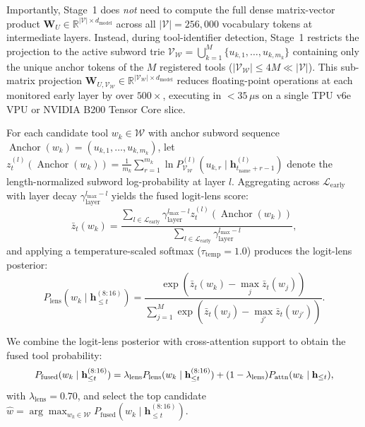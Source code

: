 \documentclass[10pt,conference]{IEEEtran}
\begin{document}
Importantly, Stage~1 does \emph{not} need to compute the full dense matrix-vector product $\mathbf{W}_U \in \mathbb{R}^{|\mathcal{V}| \times d_{\text{model}}}$ across all $|\mathcal{V}| = 256{,}000$ vocabulary tokens at intermediate layers. Instead, during tool-identifier detection, Stage~1 restricts the projection to the active subword trie $\mathcal{V}_{\mathcal{W}} = \bigcup_{k=1}^M \{u_{k,1}, \dots, u_{k,m_k}\}$ containing only the unique anchor tokens of the $M$ registered tools ($|\mathcal{V}_{\mathcal{W}}| \le 4M \ll |\mathcal{V}|$). This sub-matrix projection $\mathbf{W}_{U, \mathcal{V}_{\mathcal{W}}} \in \mathbb{R}^{|\mathcal{V}_{\mathcal{W}}| \times d_{\text{model}}}$ reduces floating-point operations at each monitored early layer by over $500\times$, executing in $< 35\,\mu\text{s}$ on a single TPU v6e VPU or NVIDIA B200 Tensor Core slice.

For each candidate tool $w_k \in \mathcal{W}$ with anchor subword sequence $\operatorname{Anchor}(w_k) = (u_{k,1}, \dots, u_{k,m_k})$, let $z_t^{(l)}(\operatorname{Anchor}(w_k)) = \frac{1}{m_k} \sum_{r=1}^{m_k} \ln P_{\mathcal{V}_{\mathcal{W}}}^{(l)}(u_{k,r} \mid \mathbf{h}_{t_{\text{name}}+r-1}^{(l)})$ denote the length-normalized subword log-probability at layer $l$. Aggregating across $\mathcal{L}_{\text{early}}$ with layer decay $\gamma_{\text{layer}}^{l_{\max} - l}$ yields the fused logit-lens score:
\begin{equation}
\bar{z}_t(w_k) = \frac{\sum_{l \in \mathcal{L}_{\text{early}}} \gamma_{\text{layer}}^{l_{\max} - l} z_t^{(l)}\!\left(\operatorname{Anchor}(w_k)\right)}{\sum_{l \in \mathcal{L}_{\text{early}}} \gamma_{\text{layer}}^{l_{\max} - l}},
\label{eq:weighted_logit_score}
\end{equation}
and applying a temperature-scaled softmax ($\tau_{\text{temp}} = 1.0$) produces the logit-lens posterior:
\begin{equation}
P_{\text{lens}}\!\left(w_k \mid \mathbf{h}_{\le t}^{(8:16)}\right) = \frac{\exp\!\left(\bar{z}_t(w_k) - \max_{j} \bar{z}_t(w_j)\right)}{\sum_{j=1}^M \exp\!\left(\bar{z}_t(w_j) - \max_{j'} \bar{z}_t(w_{j'})\right)}.
\label{eq:lens_posterior}
\end{equation}

We combine the logit-lens posterior with cross-attention support to obtain the fused tool probability:
\begin{equation}
\resizebox{0.88\columnwidth}{!}{$\displaystyle
P_{\text{fused}}(w_k \mid \mathbf{h}_{\le t}^{(8:16)}) = \lambda_{\text{lens}} P_{\text{lens}}(w_k \mid \mathbf{h}_{\le t}^{(8:16)}) + (1 - \lambda_{\text{lens}}) P_{\text{attn}}(w_k \mid \mathbf{h}_{\le t}),
$}
\label{eq:fused_posterior}
\end{equation}
with $\lambda_{\text{lens}} = 0.70$, and select the top candidate $\hat{w} = \arg\max_{w_k \in \mathcal{W}} P_{\text{fused}}(w_k \mid \mathbf{h}_{\le t}^{(8:16)})$.
\end{document}
